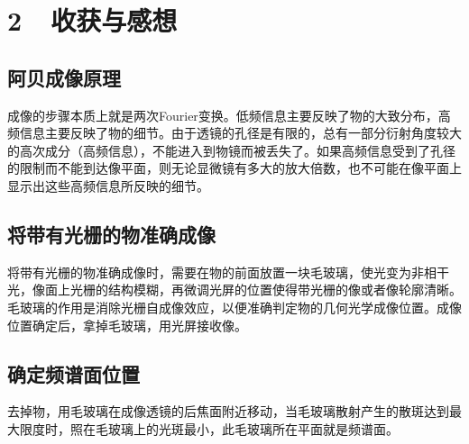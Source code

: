 \documentclass[a4paper,fontset=windows]{ctexart}
\begin{document}
    \section*{2\ \  收获与感想}

    \subsection*{阿贝成像原理}

    成像的步骤本质上就是两次Fourier变换。低频信息主要反映了物的大致分布，高频信息主要反映了物的细节。由于透镜的孔径是有限的，总有一部分衍射角度较大的高次成分（高频信息），不能进入到物镜而被丢失了。如果高频信息受到了孔径的限制而不能到达像平面，则无论显微镜有多大的放大倍数，也不可能在像平面上显示出这些高频信息所反映的细节。

    \subsection*{将带有光栅的物准确成像}

    将带有光栅的物准确成像时，需要在物的前面放置一块毛玻璃，使光变为非相干光，像面上光栅的结构模糊，再微调光屏的位置使得带光栅的像或者像轮廓清晰。毛玻璃的作用是消除光栅自成像效应，以便准确判定物的几何光学成像位置。成像位置确定后，拿掉毛玻璃，用光屏接收像。

    \subsection*{确定频谱面位置}

    去掉物，用毛玻璃在成像透镜的后焦面附近移动，当毛玻璃散射产生的散斑达到最大限度时，照在毛玻璃上的光斑最小，此毛玻璃所在平面就是频谱面。
\end{document}
